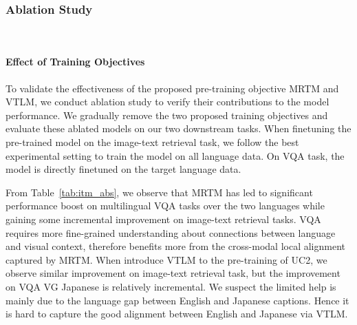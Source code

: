 \documentclass[final]{cvpr}
\begin{document}
\subsubsection{Ablation Study}~\label{sec:ablate}
\vspace{-3mm}
\paragraph{Effect of Training Objectives} To validate the effectiveness of the proposed pre-training objective MRTM and VTLM, we conduct ablation study to verify their contributions to the model performance. We gradually remove the two proposed training objectives and evaluate these ablated models on our two downstream tasks. 
When finetuning the pre-trained model on the image-text retrieval task, we follow the best experimental setting to train the model on all language data. On VQA task, the model is directly finetuned on the target language data. %

From Table~\ref{tab:itm_abs}, we observe that MRTM has led to significant performance boost on multilingual VQA tasks over the two languages while gaining some incremental improvement on image-text retrieval tasks. VQA requires more fine-grained understanding about connections between language and visual context, therefore benefits more from the cross-modal local alignment captured by MRTM. When introduce VTLM to the pre-training of UC2, we observe similar improvement on image-text retrieval task, but the improvement on VQA VG Japanese is relatively incremental. We suspect the limited help is mainly due to the language gap between English and Japanese captions. Hence it is hard to capture the good alignment between English and Japanese via VTLM. 
\end{document}
